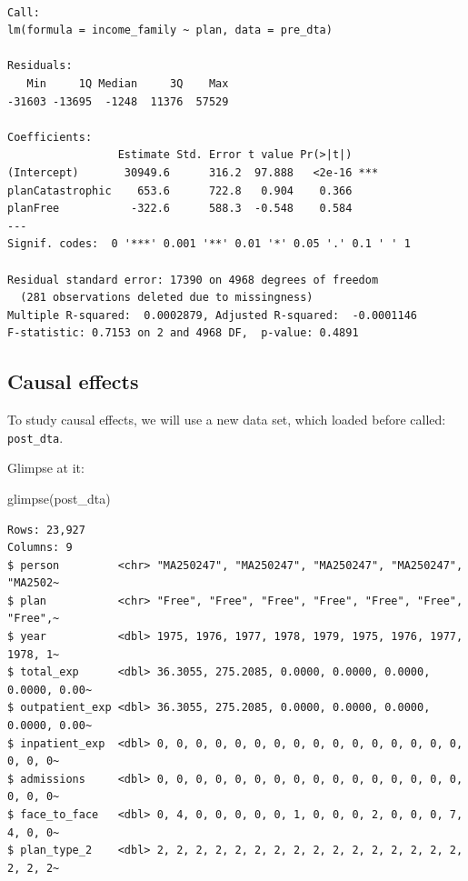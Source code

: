 \documentclass[
  letterpaper,
  DIV=11,
  numbers=noendperiod]{scrartcl}
\newenvironment{Shaded}{\begin{snugshade}}{\end{snugshade}}
\newcommand{\FunctionTok}[1]{\textcolor[rgb]{0.28,0.35,0.67}{#1}}
\newcommand{\NormalTok}[1]{\textcolor[rgb]{0.00,0.23,0.31}{#1}}
\begin{document}
\begin{verbatim}

Call:
lm(formula = income_family ~ plan, data = pre_dta)

Residuals:
   Min     1Q Median     3Q    Max 
-31603 -13695  -1248  11376  57529 

Coefficients:
                 Estimate Std. Error t value Pr(>|t|)    
(Intercept)       30949.6      316.2  97.888   <2e-16 ***
planCatastrophic    653.6      722.8   0.904    0.366    
planFree           -322.6      588.3  -0.548    0.584    
---
Signif. codes:  0 '***' 0.001 '**' 0.01 '*' 0.05 '.' 0.1 ' ' 1

Residual standard error: 17390 on 4968 degrees of freedom
  (281 observations deleted due to missingness)
Multiple R-squared:  0.0002879, Adjusted R-squared:  -0.0001146 
F-statistic: 0.7153 on 2 and 4968 DF,  p-value: 0.4891
\end{verbatim}

\hypertarget{causal-effects}{%
\subsection{Causal effects}\label{causal-effects}}

To study causal effects, we will use a new data set, which loaded before
called: \texttt{post\_dta}.

Glimpse at it:

\begin{Shaded}
\begin{Highlighting}[]
\FunctionTok{glimpse}\NormalTok{(post\_dta)}
\end{Highlighting}
\end{Shaded}

\begin{verbatim}
Rows: 23,927
Columns: 9
$ person         <chr> "MA250247", "MA250247", "MA250247", "MA250247", "MA2502~
$ plan           <chr> "Free", "Free", "Free", "Free", "Free", "Free", "Free",~
$ year           <dbl> 1975, 1976, 1977, 1978, 1979, 1975, 1976, 1977, 1978, 1~
$ total_exp      <dbl> 36.3055, 275.2085, 0.0000, 0.0000, 0.0000, 0.0000, 0.00~
$ outpatient_exp <dbl> 36.3055, 275.2085, 0.0000, 0.0000, 0.0000, 0.0000, 0.00~
$ inpatient_exp  <dbl> 0, 0, 0, 0, 0, 0, 0, 0, 0, 0, 0, 0, 0, 0, 0, 0, 0, 0, 0~
$ admissions     <dbl> 0, 0, 0, 0, 0, 0, 0, 0, 0, 0, 0, 0, 0, 0, 0, 0, 0, 0, 0~
$ face_to_face   <dbl> 0, 4, 0, 0, 0, 0, 0, 1, 0, 0, 0, 2, 0, 0, 0, 7, 4, 0, 0~
$ plan_type_2    <dbl> 2, 2, 2, 2, 2, 2, 2, 2, 2, 2, 2, 2, 2, 2, 2, 2, 2, 2, 2~
\end{verbatim}
\end{document}
